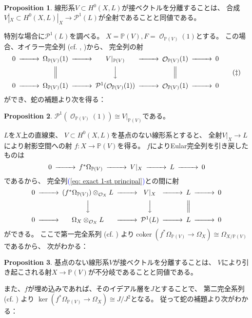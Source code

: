 \documentclass[uplatex]{jsarticle}
\renewcommand{\eqref}[1]{\textcolor{blue}{(\ref{#1})}}
\theoremstyle{definition}
\newtheorem{prop}[prop]{Proposition}
\DeclareMathOperator{\coker}{\mathrm{coker}}
\renewcommand{\P}{\mathbb{P}}
\newcommand{\mcO}{\mathcal{O}}
\newcommand{\mcP}{\mathcal{P}}
\DeclareMathOperator{\OOO}{\mcO}
\newcommand{\OX}{\OOO_X}
\newcommand{\OO}[1]{\OOO_{#1}}
\begin{document}
\begin{prop}\label{prop: tan vec sheaf}
  線形系\(V\subset H^0(X,L)\)が接ベクトルを分離することは、
  合成\(V|_X\subset H^0(X,L)|_X\to \mcP^1(L)\)が全射であることと同値である。
\end{prop}

特別な場合に\(\mcP^1(L)\)を調べる。
\(X=\P(V), F=\OO{\P(V)}(1)\)とする。
この場合、オイラー完全列 (cf. \cite[定理 8.13]{Ha}, \cite[Proposition 3]{YJ})から、
完全列の射
\begin{equation}\label{eq: Eular and principal}
  \begin{CD}
    0 @>>> \Omega_{\P(V)}(1) @>>> V|_{\P(V)} @>>> \OO{\P(V)}(1) @>>> 0 \\
    @. @| @VVV @| @. \\
    0 @>>> \Omega_{\P(V)}(1) @>>> \mcP^1(\OO{\P(V)}(1)) @>>> \OO{\P(V)}(1) @>>> 0
  \end{CD}
  \tag{\(\ddagger\)}
\end{equation}
ができ、蛇の補題より次を得る：

\begin{prop}
  \(\mcP^1(\OO{\P(V)}(1))\cong V|_{\P(V)}\)である。
\end{prop}


\(L\)を\(X\)上の直線束、
\(V\subset H^0(X,L)\)を基点のない線形系とすると、
全射\(V|_X\to L\)により射影空間への射
\(f:X\to \P(V)\)を得る。
\(f\)によりEular完全列を引き戻したものは
\[
\begin{CD}
  0 @>>> f^*\Omega_{\P(V)} @>>> V|_X @>>> L @>>> 0
\end{CD}
\]
であるから、
完全列\eqref{eq: exact 1-st principal}との間に射
\[
\begin{CD}
  0 @>>> (f^*\Omega_{\P(V)})\otimes_{\OX}L @>>> V|_X @>>> L @>>> 0 \\
  @. @VVV @VVV @| @. \\
  0 @>>> \Omega_X\otimes_{\OX}L @>>> \mcP^1(L) @>>> L @>>> 0
\end{CD}
\]
ができる。
ここで第一完全系列 (cf. \cite[命題 II.8.11]{Ha})
より\(\coker(f^*\Omega_{\P(V)}\to \Omega_X)\cong \Omega_{X/\P(V)}\)であるから、
次がわかる：

\begin{prop}\label{prop: sep tan unramified}
  基点のない線形系\(V\)が接ベクトルを分離することは、
  \(V\)により引き起こされる射\(X\to \P(V)\)が不分岐であることと同値である。
\end{prop}

また、\(f\)が埋め込みであれば、そのイデアル層を\(J\)とすることで、
第二完全系列 (cf. \cite[命題 II.8.12]{Ha}) より
\(\ker(f^*\Omega_{\P(V)}\to \Omega_X)\cong J/J^2\)となる。
従って蛇の補題より次がわかる：
\end{document}
